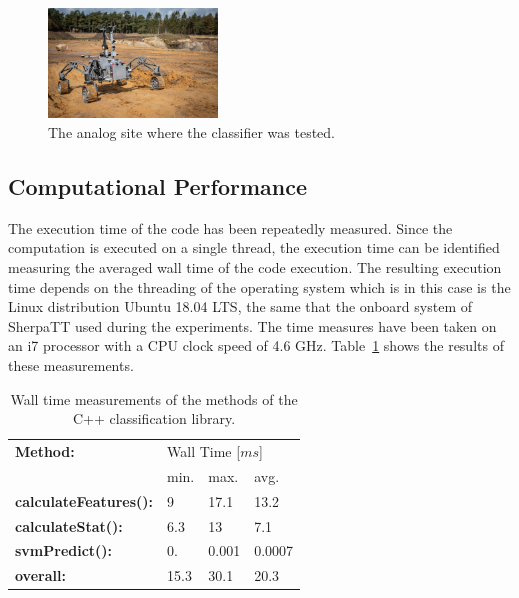 \documentclass{article}
\begin{document}
\begin{figure}[!htb]
    \centering
        \includegraphics[width=0.4\textwidth]{../figures/sandmine_v2.jpg}
    \caption{The analog site where the classifier was tested.}
    \label{fig:finaltest}
\end{figure}


\subsection{Computational Performance}

The execution time of the code has been repeatedly measured. 
Since the computation is executed on a single thread, the execution time can be identified measuring the averaged wall time of the code execution. 
The resulting execution time depends on the threading of the operating system which is in this case is the Linux distribution Ubuntu 18.04 LTS, the same that the onboard system of SherpaTT used during the experiments. 
The time measures have been taken on an i7 processor with a CPU clock speed of 4.6 GHz. 
Table~\ref{table:compmeasurments} shows the results of these measurements. 


\begin{table}[htb!]
   \centering
    \begin{tabularx}{\columnwidth}{X|XXX}
        \textbf{Method:} & \multicolumn{3}{X}{Wall Time [$ms$]} \\
        &min.&max.&avg.\\
        \hline
        \hline
        \textbf{calculateFeatures():} & 9&  17.1& 13.2 \\
        \textbf{calculateStat():}     & 6.3 & 13 & 7.1 \\
        \textbf{svmPredict():}        &  0. &  0.001 & 0.0007  \\
        \hline
        \textbf{overall:}             & 15.3 & 30.1 &20.3  \\
    \end{tabularx}	
    \caption{Wall time measurements of the methods of the C++ classification library.}
    \label{table:compmeasurments}
\end{table}
\end{document}
